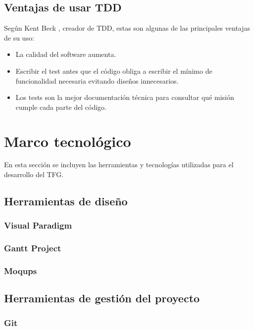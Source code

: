 	\subsection{Ventajas de usar \ac{TDD}}
	Según Kent Beck \cite{Beck04}, creador de TDD, estas son algunas de las principales ventajas de su uso:
	
	\begin{itemize}[label={$\bullet$},labelindent=\parindent,leftmargin=2cm]
		\item La calidad del software aumenta.
		\item Escribir el test antes que el código obliga a escribir el mínimo de funcionalidad necesaria evitando diseños innecesarios.
		\item Los tests son la mejor documentación técnica para consultar qué misión cumple cada parte del código.
	\end{itemize}
	

\section{Marco tecnológico}
En esta sección se incluyen las herramientas y tecnologías utilizadas para el desarrollo del \ac{TFG}.

	\subsection{Herramientas de diseño}
		\subsubsection{Visual Paradigm}
		
		\subsubsection{Gantt Project}
		
		\subsubsection{Moqups}		
	
	\subsection{Herramientas de gestión del proyecto}
		\subsubsection{Git}
		
